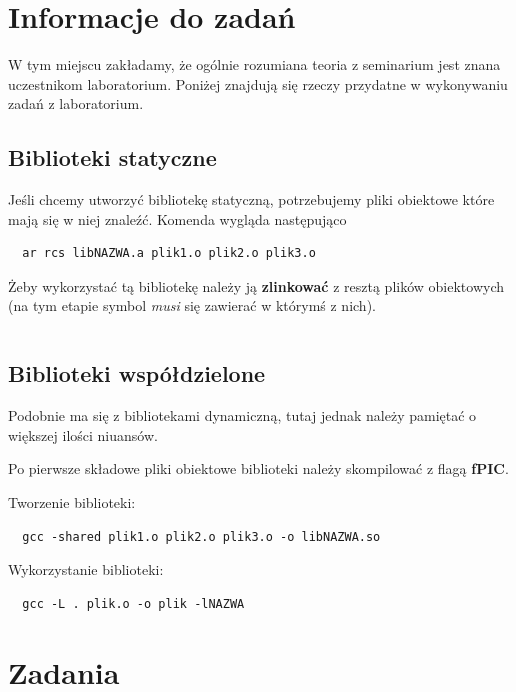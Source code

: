 \documentclass[12pt]{article}
\begin{document}

\tableofcontents
\pagebreak



\section{Informacje do zadań}
W tym miejscu zakładamy, że ogólnie rozumiana teoria z seminarium jest znana
uczestnikom laboratorium. Poniżej znajdują się rzeczy przydatne w wykonywaniu
zadań z laboratorium.
\subsection{Biblioteki statyczne}
Jeśli chcemy utworzyć bibliotekę statyczną, potrzebujemy pliki obiektowe które
mają się w niej znaleźć. Komenda wygląda następująco
\begin{lstlisting}
  ar rcs libNAZWA.a plik1.o plik2.o plik3.o
\end{lstlisting}
Żeby wykorzystać tą bibliotekę należy ją \textbf{zlinkować} z resztą plików
obiektowych (na tym etapie symbol \textit{musi} się zawierać w którymś z nich).
\begin{lstlisting}

\end{lstlisting}
\subsection{Biblioteki współdzielone}
Podobnie ma się z bibliotekami dynamiczną, tutaj jednak należy pamiętać o
większej ilości niuansów.

Po pierwsze składowe pliki obiektowe biblioteki należy skompilować z flagą
\textbf{fPIC}.

Tworzenie biblioteki:
\begin{lstlisting}
  gcc -shared plik1.o plik2.o plik3.o -o libNAZWA.so
\end{lstlisting}

Wykorzystanie biblioteki:

\begin{lstlisting}
  gcc -L . plik.o -o plik -lNAZWA
\end{lstlisting}




\section{Zadania}
\end{document}

